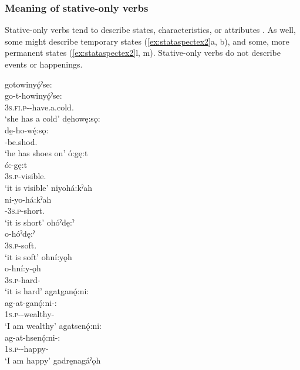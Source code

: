 \subsubsection{Meaning of stative-only verbs}
Stative-only verbs tend to describe states, characteristics, or attributes . As well, some might describe temporary states (\ref{ex:stataspectex2}a, b), and some, more permanent states (\ref{ex:stataspectex2}l, m). Stative-only verbs do not describe events or happenings.

\ea\label{ex:stataspectex2}
\ea gotowinyǫ́ˀse:\\\label{ex:stataspectex2a}
\gll go-t-howinyǫ́ˀse:\\
 \textsc{3s.fi.p}-{\semireflexive}-have.a.cold.{\stative}\\
\glt `she has a cold'
\ex de̱howę:sǫ:\\\label{ex:stataspectex2b}
\gll de̱-ho-wę́:sǫ:\\
 -be.shod.{\stative}\\
\glt `he has shoes on'
\ex ó:gę:t\\\label{ex:stataspectex2c}
\gll ó:-gę:t\\
 \textsc{3s.p}-visible.{\stative}\\
\glt `it is visible'
\ex niyohá:kˀah\\\label{ex:stataspectex2d}
\gll ni-yo-há:kˀah\\
 {\partitive}-\textsc{3s.p}-short.{\stative}\\
\glt `it is short'
\ex ohóˀdę:ˀ\\\label{ex:stataspectex2e}
\gll o-hóˀdę:ˀ\\
 \textsc{3s.p}-soft.{\stative}\\
\glt `it is soft'
\ex ohní:yǫh\\\label{ex:stataspectex2f}
\gll o-hní:y-ǫh\\
 \textsc{3s.p}-hard-{\stative}\\
\glt `it is hard'
\ex agatganǫ́:ni:\\\label{ex:stataspectex2g}
\gll ag-at-ganǫ́:ni-:\\
 \textsc{1s.p}-{\semireflexive}-wealthy-{\stative}\\
\glt `I am wealthy'
\ex agatsenǫ́:ni:\\\label{ex:stataspectex2h}
\gll ag-at-hsenǫ́:ni-:\\
 \textsc{1s.p}-{\semireflexive}-happy-{\stative}\\
\glt `I am happy'
\ex gadręnagáˀǫh\\\label{ex:stataspectex2i}
